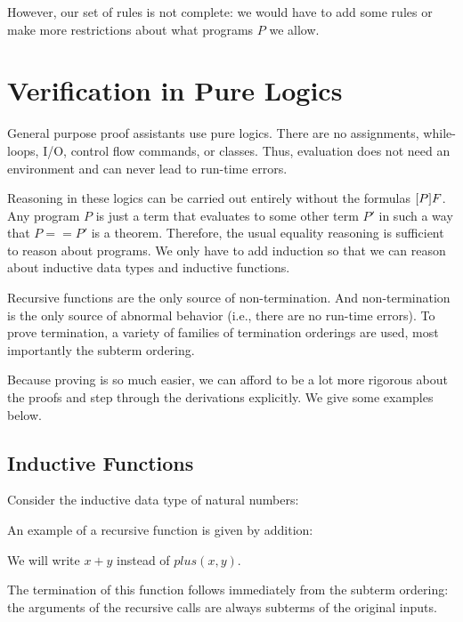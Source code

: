 However, our set of rules is not complete: we would have to add some rules or make more restrictions about what programs $P$ we allow.

\section{Verification in Pure Logics}

General purpose proof assistants use pure logics.
There are no assignments, while-loops, I/O, control flow commands, or classes.
Thus, evaluation does not need an environment and can never lead to run-time errors.

Reasoning in these logics can be carried out entirely without the formulas $[P]F$.
Any program $P$ is just a term that evaluates to some other term $P'$ in such a way that $P==P'$ is a theorem.
Therefore, the usual equality reasoning is sufficient to reason about programs.
We only have to add induction so that we can reason about inductive data types and inductive functions.

Recursive functions are the only source of non-termination.
And non-termination is the only source of abnormal behavior (i.e., there are no run-time errors).
To prove termination, a variety of families of termination orderings are used, most importantly the subterm ordering.

Because proving is so much easier, we can afford to be a lot more rigorous about the proofs and step through the derivations explicitly.
We give some examples below.

\subsection{Inductive Functions}

Consider the inductive data type of natural numbers:
\begin{acode}
\end{acode}

An example of a recursive function is given by addition:
\begin{acode}
\end{acode}
We will write $x+y$ instead of $plus(x,y)$.

The termination of this function follows immediately from the subterm ordering: the arguments of the recursive calls are always subterms of the original inputs.

